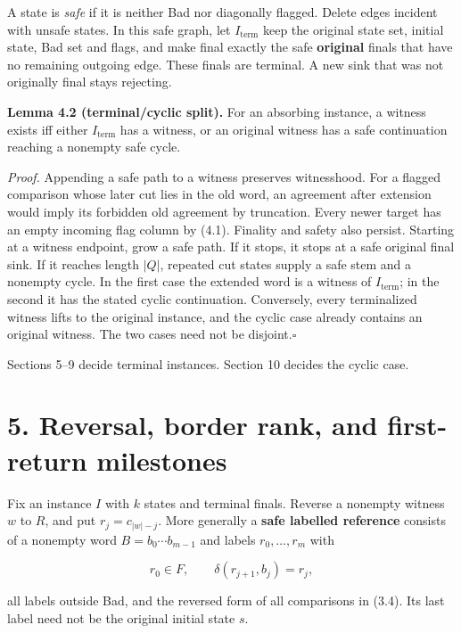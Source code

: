 \documentclass[
  11pt,
  a4paper,
]{article}
\newcounter{none} %
\begin{document}
A state is \emph{safe} if it is neither Bad nor diagonally flagged.
Delete edges incident with unsafe states. In this safe graph, let
\(I_{\mathrm{term}}\) keep the original state set, initial state, Bad
set and flags, and make final exactly the safe \textbf{original} finals
that have no remaining outgoing edge. These finals are terminal. A new
sink that was not originally final stays rejecting.


\textbf{Lemma 4.2 (terminal/cyclic split).} For an absorbing instance, a
witness exists iff either \(I_{\mathrm{term}}\) has a witness, or an
original witness has a safe continuation reaching a nonempty safe cycle.

\emph{Proof.} Appending a safe path to a witness preserves witnesshood.
For a flagged comparison whose later cut lies in the old word, an
agreement after extension would imply its forbidden old agreement by
truncation. Every newer target has an empty incoming flag column by
(4.1). Finality and safety also persist. Starting at a witness endpoint,
grow a safe path. If it stops, it stops at a safe original final sink.
If it reaches length \(|Q|\), repeated cut states supply a safe stem and
a nonempty cycle. In the first case the extended word is a witness of
\(I_{\mathrm{term}}\); in the second it has the stated cyclic
continuation. Conversely, every terminalized witness lifts to the
original instance, and the cyclic case already contains an original
witness. The two cases need not be
disjoint.\nobreak\hspace{.5em}\(\square\)

Sections 5--9 decide terminal instances. Section 10 decides the cyclic
case.


\section{5. Reversal, border rank, and first-return
milestones}\label{reversal-border-rank-and-first-return-milestones}

Fix an instance \(I\) with \(k\) states and terminal finals. Reverse a
nonempty witness \(w\) to \(R\), and put \(r_j=c_{|w|-j}\). More
generally a \textbf{safe labelled reference} consists of a nonempty word
\(B=b_0\cdots b_{m-1}\) and labels \(r_0,\ldots,r_m\) with

\[r_0\in F,\qquad \delta(r_{j+1},b_j)=r_j,\]

all labels outside Bad, and the reversed form of all comparisons in
(3.4). Its last label need not be the original initial state \(s\).
\end{document}
